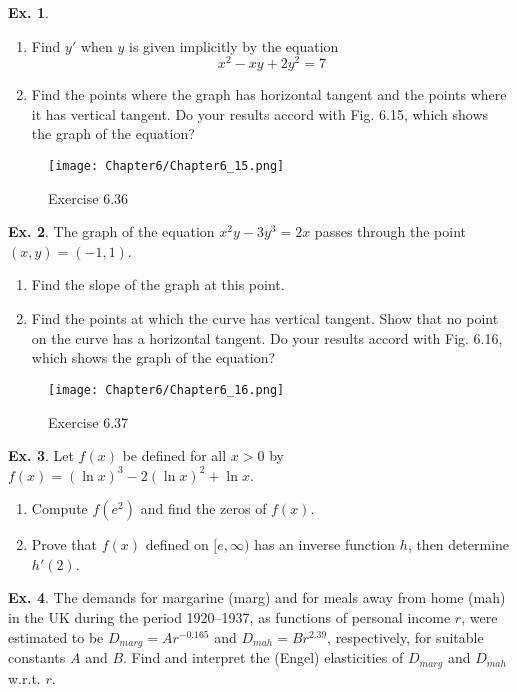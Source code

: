 \documentclass[10pt,a4paper]{book}
\theoremstyle{definition}\newtheorem{definition}{Definition}
\theoremstyle{definition}\newtheorem{fact}{Fact}
\theoremstyle{definition}\newtheorem{ex}{Ex.}
\theoremstyle{definition}\newtheorem{project}{Project}
\theoremstyle{definition}\newtheorem{problem}{Problem}
\theoremstyle{definition}\newtheorem{example}{Example}
\numberwithin{theorem}{chapter}
\numberwithin{corollary}{chapter}
\numberwithin{assumption}{chapter}
\numberwithin{definition}{chapter}
\numberwithin{prop}{chapter}
\numberwithin{notation}{chapter}
\numberwithin{problem}{chapter}
\numberwithin{example}{chapter}
\numberwithin{fact}{chapter}
\numberwithin{ex}{chapter}
\begin{document}
	\begin{ex}
		\begin{enumerate}[label=(\alph*)]
			\item Find $y'$ when $y$ is given implicitly by the equation
			$$x^2-xy+2y^2=7$$
			\item Find the points where the graph has horizontal tangent and the points where it has vertical tangent. Do your results accord with Fig. 6.15, which shows the graph of the equation?
		\end{enumerate}
		\begin{figure}[H]
			\centering
			\texttt{[image: Chapter6/Chapter6\_15.png]}
			\caption{Exercise 6.36}
		\end{figure}
	\end{ex}
	
	\begin{ex}
		The graph of the equation $x^2 y - 3y^3 = 2x$ passes through the point $(x, y) = (-1, 1)$.
		\begin{enumerate}[label=(\alph*)]
			\item Find the slope of the graph at this point.
			\item Find the points at which the curve has vertical tangent. Show that no point on the curve has a horizontal tangent. Do your results accord with Fig. 6.16, which shows the graph of the equation?
		\end{enumerate}
		\begin{figure}[H]
			\centering
			\texttt{[image: Chapter6/Chapter6\_16.png]}
			\caption{Exercise 6.37}
		\end{figure}
	\end{ex}
	
	\begin{ex}
		Let $f(x)$ be defined for all $x>0$ by $f(x)=(\ln x)^3 -2(\ln x)^2 +\ln x$.
		\begin{enumerate}[label=(\alph*)]
			\item Compute $f(e^2)$ and find the zeros of $f(x)$.
			\item Prove that $f(x)$ defined on $[e,\infty)$ has an inverse function $h$, then determine $h'(2)$.
		\end{enumerate}
	\end{ex}
	
	\begin{ex}
		The demands for margarine (marg) and for meals away from home (mah) in the UK during the period 1920–1937, as functions of personal income $r$, were estimated to be $D_{marg} = Ar^{-0.165}$ and $D_{mah} = Br^{2.39}$, respectively, for suitable constants $A$ and $B$. Find and interpret the (Engel) elasticities of $D_{marg}$ and $D_{mah}$ w.r.t. $r$.
	\end{ex}
	
\end{document}
